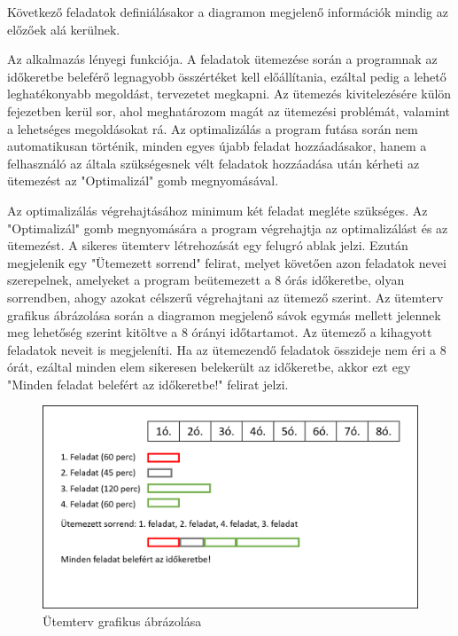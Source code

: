 Következő feladatok definiálásakor a diagramon megjelenő információk mindig az előzőek alá kerülnek.


Az alkalmazás lényegi funkciója. A feladatok ütemezése során a programnak az időkeretbe beleférő legnagyobb összértéket kell előállítania, ezáltal pedig a lehető leghatékonyabb megoldást, tervezetet megkapni. Az ütemezés kivitelezésére külön fejezetben kerül sor, ahol meghatározom magát az ütemezési problémát, valamint a lehetséges megoldásokat rá. Az optimalizálás a program futása során nem automatikusan történik, minden egyes újabb feladat hozzáadásakor, hanem a felhasználó az általa szükségesnek vélt feladatok hozzáadása után kérheti az ütemezést az "Optimalizál" gomb megnyomásával.

Az optimalizálás végrehajtásához minimum két feladat megléte szükséges. Az "Optimalizál" gomb megnyomására a program végrehajtja az optimalizálást és az ütemezést. A sikeres ütemterv létrehozását egy felugró ablak jelzi. Ezután megjelenik egy "Ütemezett sorrend" felirat, melyet követően azon feladatok nevei szerepelnek, amelyeket a program beütemezett a 8 órás időkeretbe, olyan sorrendben, ahogy azokat célszerű végrehajtani az ütemező szerint. Az ütemterv grafikus ábrázolása során a diagramon megjelenő sávok egymás mellett jelennek meg lehetőség szerint kitöltve a 8 órányi időtartamot. Az ütemező a kihagyott feladatok neveit is megjeleníti. Ha az ütemezendő feladatok összideje nem éri a 8 órát, ezáltal minden elem sikeresen belekerült az időkeretbe, akkor ezt egy "Minden feladat belefért az időkeretbe!" felirat jelzi.

\begin{figure}[h]
	\centering
	\includegraphics[scale=0.7]{images/scheduledTasks.png}
	\caption{Ütemterv grafikus ábrázolása}
	\label{fig:scheduledTasks}
\end{figure}



